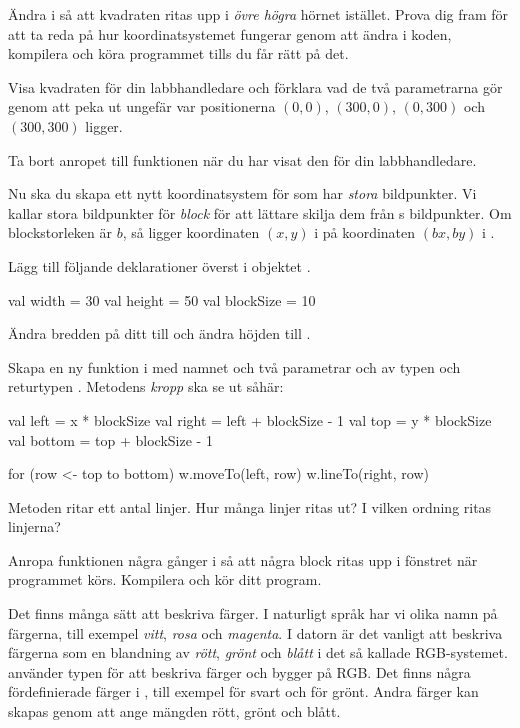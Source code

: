\Subtask
Ändra i  så att kvadraten ritas upp i \emph{övre högra} hörnet istället.
Prova dig fram för att ta reda på hur koordinatsystemet fungerar genom att ändra i koden, kompilera och köra programmet tills du får rätt på det.

\Subtask\Checkpoint
Visa kvadraten för din labbhandledare och förklara vad de två parametrarna gör genom att peka ut ungefär var positionerna $(0,0)$, $(300, 0)$, $(0, 300)$ och $(300, 300)$ ligger.

\Subtask
Ta bort anropet till funktionen  när du har visat den för din labbhandledare.

\Task
Nu ska du skapa ett nytt koordinatsystem för  som har \emph{stora} bildpunkter.
Vi kallar  stora bildpunkter för \emph{block} för att lättare skilja dem från s bildpunkter.
Om blockstorleken är $b$, så ligger koordinaten $(x, y)$ i  på koordinaten $(bx, by)$ i .

\Subtask
Lägg till följande deklarationer överst i objektet .
\begin{Code}
val width = 30
val height = 50
val blockSize = 10
\end{Code}
Ändra bredden på ditt  till  och ändra höjden till .

\Subtask
Skapa en ny funktion i  med namnet  och två parametrar  och  av typen  och returtypen .
Metodens \emph{kropp} ska se ut såhär:
\begin{Code}
{
    val left = x * blockSize
    val right = left + blockSize - 1
    val top = y * blockSize
    val bottom = top + blockSize - 1

    for (row <- top to bottom) {
      w.moveTo(left, row)
      w.lineTo(right, row)
    }
}
\end{Code}

\Subtask\Pen
Metoden  ritar ett antal linjer.
Hur många linjer ritas ut?
I vilken ordning ritas linjerna?

\Subtask
Anropa funktionen  några gånger i  så att några block ritas upp i fönstret när programmet körs.
Kompilera och kör ditt program.


\Task
Det finns många sätt att beskriva färger.
I naturligt språk har vi olika namn på färgerna, till exempel \emph{vitt}, \emph{rosa} och \emph{magenta}.
I datorn är det vanligt att beskriva färgerna som en blandning av \emph{rött}, \emph{grönt} och \emph{blått} i det så kallade RGB-systemet.
 använder typen  för att beskriva färger och  bygger på RGB.
Det finns några fördefinierade färger i , till exempel  för svart och  för grönt.
Andra färger kan skapas genom att ange mängden rött, grönt och blått.


